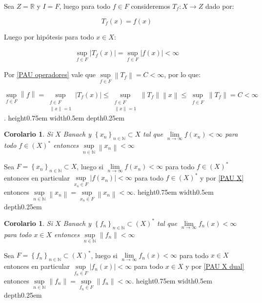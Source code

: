 \documentclass[11pt]{article}
\newcommand{\R}{{\mathbb{R}}}
\newcommand{\N}{{\mathbb{N}}}
\newcommand{\dual}[1]{\left(#1\right)^{\ast}}
\newcommand{\norm}[1]{\left\lVert#1\right\rVert}
\newcommand{\abs}[1]{\left\lvert#1\right\rvert}
\newcommand{\sett}[1]{\left\lbrace#1\right\rbrace}
\numberwithin{theorem}{subsection}
\newtheorem{corollary}[theorem]{Corolario}
\newenvironment{proof}[1][Demostraci\'on]{\begin{trivlist}
		\item[\hskip \labelsep {\bfseries #1}]}{\end{trivlist}}
\newcommand{\qed}{\nobreak \ifvmode \relax \else
	\ifdim\lastskip<1.5em \hskip-\lastskip
	\hskip1.5em plus0em minus0.5em \fi \nobreak
	\vrule height0.75em width0.5em depth0.25em\fi}
\begin{document}
\begin{proof}
	Sea $Z=\R$ y $I = F$, luego para todo $f \in F$ consideremos $T_f : X \rightarrow Z$ dado por:
	
	\[
	T_f(x) = f(x)
	\]
	
	Luego por hip\'otesis para todo $x \in X$:
	
	\[
	\begin{aligned}
	\sup\limits_{f \in F} \abs{T_f(x)} = \sup\limits_{f \in F} \abs{f(x)} < \infty
	\end{aligned}
	\]
	
	Por \ref{PAU operadores} vale que $\sup\limits_{f \in F} \norm{T_f} = C < \infty$, por lo que:
	
	\[
	\sup\limits_{f \in F} \norm{f} = \sup\limits_{\substack{f \in F \\ \norm{x} = 1}} \abs{T_f(x)} \leq \sup\limits_{\substack{f \in F \\ \norm{x} = 1}} \norm{T_f}\norm{x} \leq \sup\limits_{\substack{f \in F }} \norm{T_f} = C < \infty
	\]
	.\qed
\end{proof}

\begin{corollary}
	\label{Si una sucesion converge debilmente entonces esta fuertemente acotada}
	Si $X$ Banach y $\sett{x_n}_{n \in \N} \subset X$ tal que $\lim\limits_{n \rightarrow \infty}{f(x_n)} < \infty$ para todo $f \in \dual{X}$ entonces $\sup\limits_{n \in \N}{\norm{x_n}} < \infty$
\end{corollary}

\begin{proof}
	Sea $F = \sett{x_n}_{n \in \N} \subset X$, luego si $\lim\limits_{n \rightarrow \infty}{f(x_n)} < \infty$ para todo $f \in \dual{X}$ entonces en particular $\sup\limits_{x_n \in F}{\abs{f(x_n)}} < \infty$ para todo $f \in \dual{X}$ y por \ref{PAU X} entonces $\sup\limits_{n \in \N}{\norm{x_n}} = \sup\limits_{x_n \in F}{\norm{x_n}} < \infty$. \qed
\end{proof}

\begin{corollary}
	\label{Si una sucesion converge debilmente estrella entonces esta fuertemente acotada}
	Si $X$ Banach y $\sett{f_n}_{n \in \N} \subset \dual{X}$ tal que $\lim\limits_{n \rightarrow \infty}{f_n(x)} < \infty$ para todo $x \in X$ entonces $\sup\limits_{n \in \N}{\norm{f_n}} < \infty$
\end{corollary}

\begin{proof}
	Sea $F = \sett{f_n}_{n \in \N} \subset \dual{X}$, luego si $\lim\limits_{n \rightarrow \infty}{f_n(x)} < \infty$ para todo $x \in X$ entonces en particular $\sup\limits_{f_n \in F}{\abs{f_n(x)}} < \infty$ para todo $x \in X$ y por \ref{PAU X dual} entonces $\sup\limits_{n \in \N}{\norm{f_n}} = \sup\limits_{f_n \in F}{\norm{f_n}} < \infty$. \qed
\end{proof}
\end{document}
